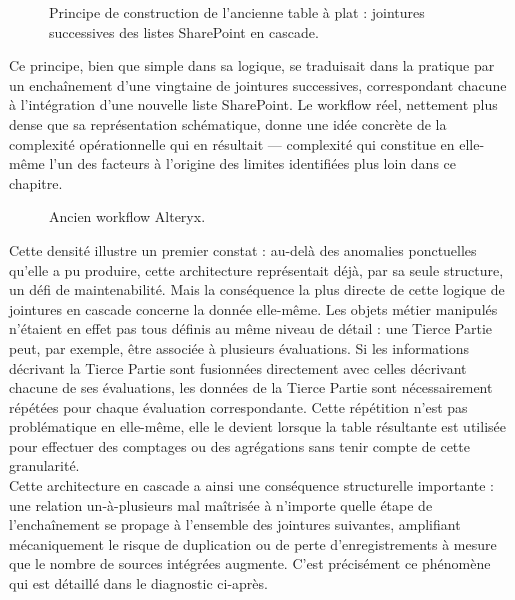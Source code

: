 \begin{figure}[H]
    \centering
    \caption{Principe de construction de l'ancienne table à plat : jointures successives des listes SharePoint en cascade.}
    \label{jointures_successives_des_listes}
\end{figure}
 
Ce principe, bien que simple dans sa logique, se traduisait dans la pratique par un 
enchaînement d'une vingtaine de jointures successives, correspondant chacune à l'intégration 
d'une nouvelle liste SharePoint. Le workflow réel, nettement plus dense que sa représentation 
schématique, donne une idée concrète de la complexité opérationnelle qui en résultait — 
complexité qui constitue en elle-même l'un des facteurs à l'origine des limites identifiées plus 
loin dans ce chapitre.

\begin{figure}[H]
    \centering
    \caption{Ancien workflow Alteryx.}
    \label{Ancien_workflow_alteryx}
\end{figure}

Cette densité illustre un premier constat : au-delà des anomalies ponctuelles qu'elle a 
pu produire, cette architecture représentait déjà, par sa seule structure, un défi de 
maintenabilité. Mais la conséquence la plus directe de cette logique de jointures en cascade 
concerne la donnée elle-même. Les objets métier manipulés n'étaient en effet pas tous définis 
au même niveau de détail : une Tierce Partie peut, par exemple, être associée à plusieurs 
évaluations. Si les informations décrivant la Tierce Partie sont fusionnées directement avec 
celles décrivant chacune de ses évaluations, les données de la Tierce Partie sont 
nécessairement répétées pour chaque évaluation correspondante. Cette répétition n'est pas 
problématique en elle-même, elle le devient lorsque la table résultante est utilisée pour 
effectuer des comptages ou des agrégations sans tenir compte de cette granularité. \\

Cette architecture en cascade a ainsi une conséquence structurelle importante : une 
relation un-à-plusieurs mal maîtrisée à n'importe quelle étape de l'enchaînement se propage 
à l'ensemble des jointures suivantes, amplifiant mécaniquement le risque de duplication ou de 
perte d'enregistrements à mesure que le nombre de sources intégrées augmente. C'est 
précisément ce phénomène qui est détaillé dans le diagnostic ci-après. 

